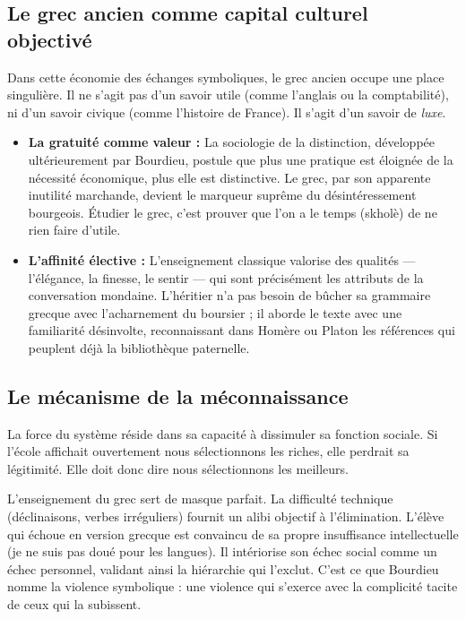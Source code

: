 \subsection{Le grec ancien comme capital culturel objectivé}

Dans cette économie des échanges symboliques, le grec ancien occupe une place singulière. Il ne
s'agit pas d'un savoir utile (comme l'anglais ou la comptabilité), ni d'un savoir civique (comme
l'histoire de France). Il s'agit d'un savoir de \textit{luxe}.

\begin{itemize}\item \textbf{La gratuité comme valeur :} La sociologie de la distinction, développée ultérieurement par Bourdieu, postule que plus une pratique est éloignée de la nécessité économique, plus elle est distinctive.\cite{I-2-3-ref6} Le grec, par son apparente inutilité marchande, devient le marqueur suprême du désintéressement bourgeois. Étudier le grec, c'est prouver que l'on a le temps (\og skholè\fg{}) de ne rien faire d'utile.\item \textbf{L'affinité élective :} L'enseignement classique valorise des qualités — l'élégance, la finesse, le \og sentir\fg{} — qui sont précisément les attributs de la conversation mondaine. L'héritier n'a pas besoin de \og bûcher\fg{} sa grammaire grecque avec l'acharnement du boursier ; il aborde le texte avec une familiarité désinvolte, reconnaissant dans Homère ou Platon les références qui peuplent déjà la bibliothèque paternelle.\cite{I-2-3-ref8}\end{itemize}

\subsection{Le mécanisme de la méconnaissance}

La force du système réside dans sa capacité à dissimuler sa fonction sociale. Si l'école affichait
ouvertement \og nous sélectionnons les riches\fg{}, elle perdrait sa légitimité. Elle doit donc dire
\og nous sélectionnons les meilleurs\fg{}.

L'enseignement du grec sert de masque parfait. La difficulté technique (déclinaisons, verbes
irréguliers) fournit un alibi objectif à l'élimination. L'élève qui échoue en version grecque est
convaincu de sa propre insuffisance intellectuelle (\og je ne suis pas doué pour les langues\fg{}).
Il intériorise son échec social comme un échec personnel, validant ainsi la hiérarchie qui l'exclut.
C'est ce que Bourdieu nomme la violence symbolique : une violence qui s'exerce avec la complicité
tacite de ceux qui la subissent.\cite{I-2-3-ref10}



